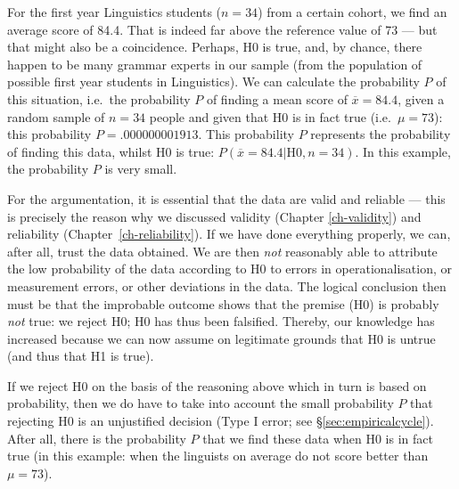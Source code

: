 \documentclass[
]{book}
\begin{document}
For the first year Linguistics students (\(n=34\)) from a certain cohort,
we find an average score of 84.4. That is indeed far above the reference value
of 73 --- but that might also be a coincidence.
Perhaps, H0 is true, and, by chance, there happen to be many grammar experts
in our sample (from the population of possible first year students
in Linguistics). We can calculate the probability \(P\) of this situation,
i.e.~the probability \(P\) of finding a mean score of \(\overline{x}=84.4\),
given a random sample of \(n=34\) people and given that
H0 is in fact true (i.e.~\(\mu=73\)): this probability
\(P=.000000001913\). This probability \(P\) represents the probability of finding this
data, whilst H0 is true:
\(P(\overline{x}=84.4|\textrm{H0},n=34)\).
In this example, the probability \(P\) is very small.

For the argumentation, it is essential that the data are valid and
reliable --- this is precisely the reason why we discussed validity
(Chapter \ref{ch-validity}) and reliability
(Chapter~\ref{ch-reliability}). If we have done everything properly,
we can, after all, trust the data obtained.
We are then \emph{not} reasonably able to attribute the low probability of the data according
to H0 to errors in operationalisation, or measurement errors, or other deviations in the data.
The logical conclusion then must be that the improbable outcome shows that the
premise (H0) is probably \emph{not} true: we reject H0; H0 has thus been
falsified. Thereby, our knowledge has increased because we can now
assume on legitimate grounds that H0 is untrue (and thus that H1
is true).

If we reject H0 on the basis of the reasoning above which in turn is
based on probability, then we do have to take into account the small
probability \(P\) that rejecting H0 is an unjustified decision (Type I error; see
§\ref{sec:empiricalcycle}). After all, there is the probability \(P\) that
we find these data when H0 is in fact true (in this example: when the linguists
on average do not score better than \(\mu=73\)).
\end{document}
